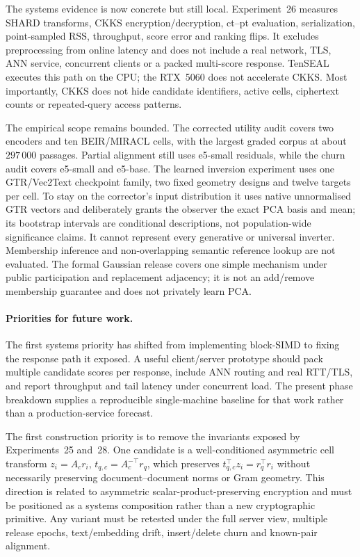 The systems evidence is now concrete but still local. Experiment~26 measures
SHARD transforms, CKKS encryption/decryption, ct--pt evaluation,
serialization, point-sampled RSS, throughput, score error and ranking flips.
It excludes preprocessing from online latency and does not include a real
network, TLS, ANN service, concurrent clients or a packed multi-score response.
TenSEAL executes this path on the CPU; the RTX~5060 does not accelerate CKKS.
Most importantly, CKKS does not hide candidate identifiers, active cells,
ciphertext counts or repeated-query access patterns.

The empirical scope remains bounded. The corrected utility audit covers two
encoders and ten BEIR/MIRACL cells, with the largest graded corpus at about
$297\,000$ passages. Partial alignment still uses e5-small residuals, while
the churn audit covers e5-small and e5-base. The learned inversion experiment
uses one GTR/Vec2Text checkpoint family, two fixed geometry designs and twelve
targets per cell. To stay on the corrector's input distribution it uses native
unnormalised GTR vectors and deliberately grants the observer the exact PCA
basis and mean; its bootstrap intervals are conditional descriptions, not
population-wide significance claims. It cannot represent every generative or
universal inverter. Membership inference and non-overlapping semantic
reference lookup are not evaluated. The formal Gaussian release covers one
simple mechanism under public participation and replacement adjacency; it is
not an add/remove membership guarantee and does not privately learn PCA.

\paragraph{Priorities for future work.}
The first systems priority has shifted from implementing block-SIMD to fixing
the response path it exposed. A useful client/server prototype should pack
multiple candidate scores per response, include ANN routing and real
RTT/TLS, and report throughput and tail latency under concurrent load. The
present phase breakdown supplies a reproducible single-machine baseline for
that work rather than a production-service forecast.

The first construction priority is to remove the invariants exposed by
Experiments~25 and~28. One candidate is a well-conditioned asymmetric cell transform
$z_i=A_c r_i$, $t_{q,c}=A_c^{-\top}r_q$, which preserves
$t_{q,c}^\top z_i=r_q^\top r_i$ without necessarily preserving
document--document norms or Gram geometry. This direction is related to
asymmetric scalar-product-preserving encryption and must be positioned as a
systems composition rather than a new cryptographic primitive. Any variant
must be retested under the full server view, multiple release epochs,
text/embedding drift, insert/delete churn and known-pair alignment.

